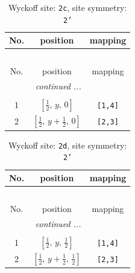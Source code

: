 \documentclass[fleqn,8pt]{jsarticle}
\begin{document}
\begin{longtable}{ccc}
\caption{Wyckoff site: {\tt 2c}, site symmetry: {\tt 2'}}
 \\
 \hline \hline
No. & position & mapping \\ \hline \endfirsthead

\multicolumn{2}{l}{\tablename\ \thetable{}} \\
 \hline \hline
No. & position & mapping \\ \hline \endhead

 \hline \hline
\multicolumn{2}{r}{\footnotesize\it continued ...} \\ \endfoot

 \hline \hline
\multicolumn{2}{r}{} \\ \endlastfoot

1 & $\left[ \frac{1}{2},\, y,\, 0 \right]$ & {\tt [1,4]} \\ \hline
2 & $\left[ \frac{1}{2},\, y + \frac{1}{2},\, 0 \right]$ & {\tt [2,3]} \\
\end{longtable}
\renewcommand{\arraystretch}{1.2}
\begin{longtable}{ccc}
\caption{Wyckoff site: {\tt 2d}, site symmetry: {\tt 2'}}
 \\
 \hline \hline
No. & position & mapping \\ \hline \endfirsthead

\multicolumn{2}{l}{\tablename\ \thetable{}} \\
 \hline \hline
No. & position & mapping \\ \hline \endhead

 \hline \hline
\multicolumn{2}{r}{\footnotesize\it continued ...} \\ \endfoot

 \hline \hline
\multicolumn{2}{r}{} \\ \endlastfoot

1 & $\left[ \frac{1}{2},\, y,\, \frac{1}{2} \right]$ & {\tt [1,4]} \\ \hline
2 & $\left[ \frac{1}{2},\, y + \frac{1}{2},\, \frac{1}{2} \right]$ & {\tt [2,3]} \\
\end{longtable}
\renewcommand{\arraystretch}{1.2}
\end{document}
